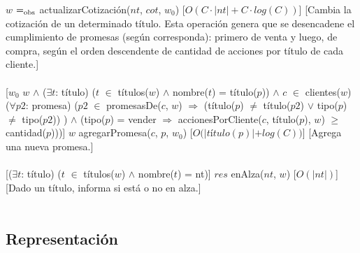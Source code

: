   {$w$ $=_{\mathrm{obs}}$ actualizarCotizaci\'on($nt$, $cot$, $w_{0}$)}%
  [$O(C \cdotp |nt|+C \cdotp log(C))$]
  [Cambia la cotizaci\'on de un determinado t\'itulo. Esta operaci\'on genera que se desencadene el cumplimiento de promesas (seg\'un corresponda): primero de venta y luego, de compra, seg\'un el orden descendente de cantidad de acciones por t\'itulo de cada cliente.]\\\\
  [$w_{0}$ \igobs $w$ $\land$ ($\exists$$t$: t\'itulo) ($t$ $\in$ t\'itulos($w$) $\land$ nombre($t$) = t\'itulo($p$)) $\land$ $c$ $\in$ clientes($w$) \yluego ($\forall$$p2$: promesa) ($p2$ $\in$ promesasDe($c$, $w$) $\Rightarrow$ (t\'itulo($p$) $\neq$ t\'itulo($p2$) $\lor$ tipo($p$) $\neq$ tipo($p2$)) ) $\land$ (tipo($p$) = vender $\Rightarrow$ accionesPorCliente($c$, t\'itulo($p$), $w$) $\geq$ cantidad($p$)))]
  {$w$ \igobs agregarPromesa($c$, $p$, $w_{0}$)}%
  [$O(|t$\'i$tulo(p)| + log(C))$]
  [Agrega una nueva promesa.]\\\\
  [($\exists$$t$: t\'itulo) ($t$ $\in$ t\'itulos($w$) $\land$ nombre($t$) = nt)]
  {$res$ \igobs enAlza($nt$, $w$)}%
  [$O(|nt|)$]
  [Dado un t\'itulo, informa si est\'a o no en alza.]\\\\


\subsection{Representaci\'on}
